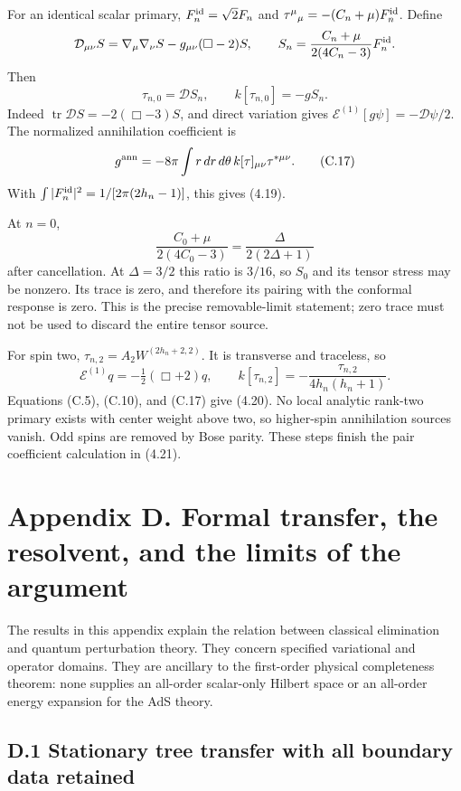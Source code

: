 \documentclass[a4paper,11pt]{article}
\numberwithin{equation}{section}
\begin{document}
For an identical scalar primary, \(F_n^{\rm id}=\sqrt2F_n\) and \(\tau^\mu{}_\mu=-(C_n+\mu)F_n^{\rm id}\). Define \[
\mathcal D_{\mu\nu}S
=\nabla_\mu\nabla_\nu S-g_{\mu\nu}(\Box-2)S,
\qquad
S_n=\frac{C_n+\mu}{2(4C_n-3)}F_n^{\rm id}.
\] Then \[
\tau_{n,0}=\mathcal DS_n,\qquad
k[\tau_{n,0}]=-gS_n .
\tag{C.16}
\] Indeed \(\operatorname{tr}\mathcal DS=-2(\Box-3)S\), and direct variation gives \(\mathcal E^{(1)}[g\psi]=-\mathcal D\psi/2\). The normalized annihilation coefficient is \[
g^{\rm ann}=-8\pi\int r\,dr\,d\theta\,
k[\tau]_{\mu\nu}\tau^{*\mu\nu}.
\tag{C.17}
\] With \(\int|F_n^{\rm id}|^2=1/[2\pi(2h_n-1)]\), this gives (4.19).

At \(n=0\), \[
\frac{C_0+\mu}{2(4C_0-3)}
=\frac{\Delta}{2(2\Delta+1)}
\] after cancellation. At \(\Delta=3/2\) this ratio is \(3/16\), so \(S_0\) and its tensor stress may be nonzero. Its trace is zero, and therefore its pairing with the conformal response is zero. This is the precise removable-limit statement; zero trace must not be used to discard the entire tensor source.

For spin two, \(\tau_{n,2}=A_2W^{(2h_n+2,2)}\). It is transverse and traceless, so \[
\mathcal E^{(1)}q=-\tfrac12(\Box+2)q,\qquad
k[\tau_{n,2}]=-\frac{\tau_{n,2}}{4h_n(h_n+1)} .
\tag{C.18}
\] Equations (C.5), (C.10), and (C.17) give (4.20). No local analytic rank-two primary exists with center weight above two, so higher-spin annihilation sources vanish. Odd spins are removed by Bose parity. These steps finish the pair coefficient calculation in (4.21).

\clearpage
\hypertarget{appendix-d.-formal-transfer-the-resolvent-and-the-limits-of-the-argument}{%
\section{Appendix D. Formal transfer, the resolvent, and the limits of the argument}\label{appendix-d.-formal-transfer-the-resolvent-and-the-limits-of-the-argument}}

The results in this appendix explain the relation between classical elimination and quantum perturbation theory. They concern specified variational and operator domains. They are ancillary to the first-order physical completeness theorem: none supplies an all-order scalar-only Hilbert space or an all-order energy expansion for the AdS theory.

\hypertarget{d.1-stationary-tree-transfer-with-all-boundary-data-retained}{%
\subsection{D.1 Stationary tree transfer with all boundary data retained}\label{d.1-stationary-tree-transfer-with-all-boundary-data-retained}}
\end{document}
